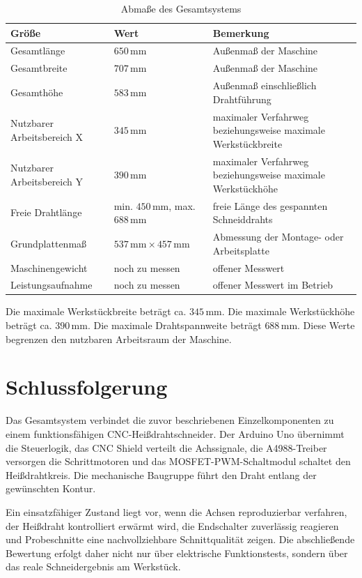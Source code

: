 \begin{table}[H]
	\centering
	\caption{Abmaße des Gesamtsystems}
	\label{tab:abmasse_gesamtsystem}
	\begin{tabular}{p{5cm} p{4cm} p{6cm}}
		\hline
		\textbf{Größe} & \textbf{Wert} & \textbf{Bemerkung} \\
		\hline
		Gesamtlänge & \(650\,\mathrm{mm}\) & Außenmaß der Maschine \\
		Gesamtbreite & \(707\,\mathrm{mm}\) & Außenmaß der Maschine \\
		Gesamthöhe & \(583\,\mathrm{mm}\) & Außenmaß einschließlich Drahtführung \\
		Nutzbarer Arbeitsbereich X & \(345\,\mathrm{mm}\) & maximaler Verfahrweg beziehungsweise maximale Werkstückbreite \\
		Nutzbarer Arbeitsbereich Y & \(390\,\mathrm{mm}\) & maximaler Verfahrweg beziehungsweise maximale Werkstückhöhe \\
		Freie Drahtlänge & min. \(450\,\mathrm{mm}\), max. \(688\,\mathrm{mm}\) & freie Länge des gespannten Schneiddrahts \\
		Grundplattenmaß & \(537\,\mathrm{mm} \times 457\,\mathrm{mm}\) & Abmessung der Montage- oder Arbeitsplatte \\
		Maschinengewicht & noch zu messen & offener Messwert \\
		Leistungsaufnahme & noch zu messen & offener Messwert im Betrieb \\
		\hline
	\end{tabular}
\end{table}

Die maximale Werkstückbreite beträgt ca. \(345\,\mathrm{mm}\). Die maximale Werkstückhöhe beträgt ca. \(390\,\mathrm{mm}\). Die maximale Drahtspannweite beträgt \(688\,\mathrm{mm}\). Diese Werte begrenzen den nutzbaren Arbeitsraum der Maschine.

\section{Schlussfolgerung}
\label{sec:komplettes_system_schlussfolgerung}

Das Gesamtsystem verbindet die zuvor beschriebenen Einzelkomponenten zu einem funktionsfähigen CNC-Heißdrahtschneider. Der Arduino Uno übernimmt die Steuerlogik, das CNC Shield verteilt die Achssignale, die A4988-Treiber versorgen die Schrittmotoren und das MOSFET-PWM-Schaltmodul schaltet den Heißdrahtkreis. Die mechanische Baugruppe führt den Draht entlang der gewünschten Kontur.

Ein einsatzfähiger Zustand liegt vor, wenn die Achsen reproduzierbar verfahren, der Heißdraht kontrolliert erwärmt wird, die Endschalter zuverlässig reagieren und Probeschnitte eine nachvollziehbare Schnittqualität zeigen. Die abschließende Bewertung erfolgt daher nicht nur über elektrische Funktionstests, sondern über das reale Schneidergebnis am Werkstück.
